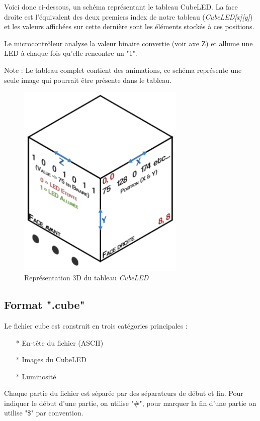 \documentclass[a4paper,12pt]{article}
\begin{document}
\noindent Voici donc ci-dessous, un schéma représentant le tableau CubeLED. La face droite est l’équivalent des deux premiers index de notre tableau (\emph{CubeLED[x][y]}) et les valeurs affichées sur cette dernière sont les éléments stockés à ces positions.

\vspace{0.5cm}

\noindent Le microcontrôleur analyse la valeur binaire convertie (voir axe Z) et allume une LED à chaque fois qu’elle rencontre un "1".

\vspace{0.5cm}

\noindent Note : Le tableau complet contient des animations, ce schéma représente une seule image qui pourrait être présente dans le tableau.

\begin{figure}[htp]
	\centering
	\includegraphics[width=8cm]{./img/schemaCube.png}
	\caption{Représentation 3D du tableau \emph{CubeLED}}
	\label{3dArray}
\end{figure}
\newpage

\subsection{Format ".cube"}
\noindent Le fichier cube est construit en trois catégories principales :
\begin{itemize}
	\item[*] En-tête du fichier (ASCII)
	\item[*] Images du CubeLED
	\item[*] Luminosité
\end{itemize}
Chaque partie du fichier est séparée par des séparateurs de début et fin. Pour indiquer le début d’une partie, on utilise "\#", pour marquer la fin d’une partie on utilise "\$" par convention.
\end{document}
